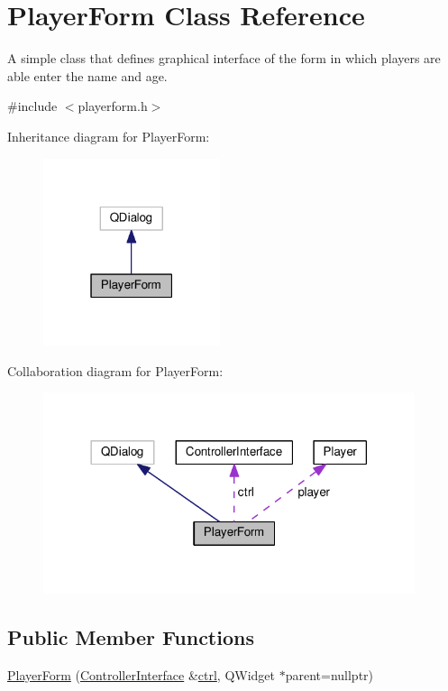 \hypertarget{classGUI_1_1PlayerForm}{}\section{Player\+Form Class Reference}
\label{classGUI_1_1PlayerForm}


A simple class that defines graphical interface of the form in which players are able enter the name and age.  




{\ttfamily \#include $<$playerform.\+h$>$}



Inheritance diagram for Player\+Form\+:\nopagebreak
\begin{figure}[H]
\begin{center}
\leavevmode
\includegraphics[width=147pt]{classGUI_1_1PlayerForm__inherit__graph}
\end{center}
\end{figure}


Collaboration diagram for Player\+Form\+:\nopagebreak
\begin{figure}[H]
\begin{center}
\leavevmode
\includegraphics[width=309pt]{classGUI_1_1PlayerForm__coll__graph}
\end{center}
\end{figure}
\subsection*{Public Member Functions}
\begin{DoxyCompactItemize}
\item 
\hyperlink{classGUI_1_1PlayerForm_adb5d9b0acdc6bd505f507533d8769558}{Player\+Form} (\hyperlink{classControllerInterface}{Controller\+Interface} \&\hyperlink{classGUI_1_1PlayerForm_a15e61471831211a4301410bdd802a4a4}{ctrl}, Q\+Widget $\ast$parent=nullptr)
\end{DoxyCompactItemize}
